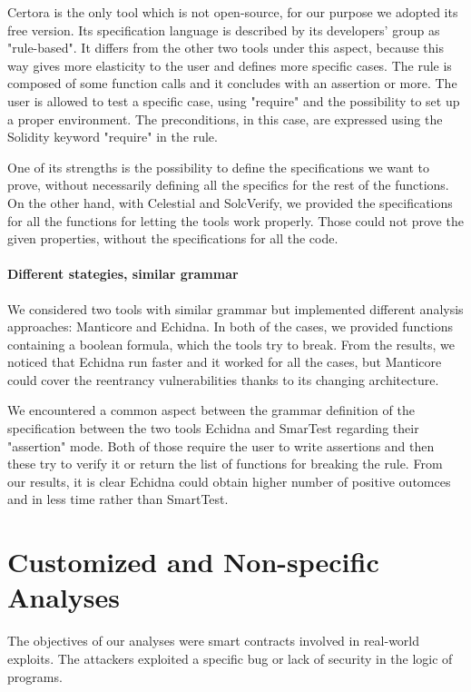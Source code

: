 Certora is the only tool which is not open-source, for our purpose we adopted its free version.
Its specification language is described by its developers' group as "rule-based". It differs from the other two tools under this aspect, because this way gives more elasticity to the user and defines more specific cases.
The rule is composed of some function calls and it concludes with an assertion or more. The user is allowed to test a specific case, using "require" and the possibility to set up a proper environment. 
The preconditions, in this case, are expressed using the Solidity keyword "require" in the rule.

One of its strengths is the possibility to define the specifications we want to prove, without necessarily defining all the specifics for the rest of the functions.
On the other hand,  with Celestial and SolcVerify, we provided the specifications for all the functions for letting the tools work properly. 
Those could not prove the given properties, without the specifications for all the code.

\paragraph{Different stategies, similar grammar}
We considered two tools with similar grammar but implemented different analysis approaches: Manticore and Echidna. 
In both of the cases, we provided functions containing a boolean formula, which the tools try to break. From the results, 
we noticed that Echidna run faster and it worked for all the cases, but Manticore could cover the reentrancy vulnerabilities thanks to its changing architecture.

We encountered a common aspect between the grammar definition of the specification between the two tools Echidna and SmarTest regarding their "assertion" mode. 
Both of those require the user to write assertions and then these try to verify it or return the list of 
functions for breaking the rule. From our results, it is clear Echidna could obtain higher number of positive outomces and in less time rather than SmartTest.



\section{Customized and Non-specific Analyses} 
The objectives of our analyses were smart contracts involved in real-world exploits. The attackers exploited a specific bug or lack of security in the logic of programs. 

